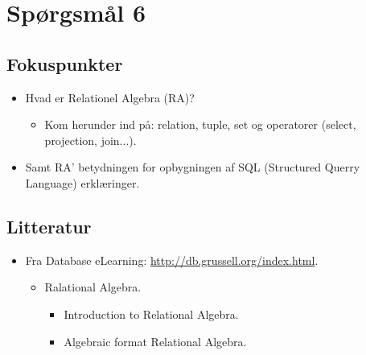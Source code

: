 \section{Spørgsmål 6}


\subsection{Fokuspunkter}
\begin{itemize}
	\item Hvad er Relationel Algebra (RA)?
	\begin{itemize}
		\item Kom herunder ind på: relation, tuple, set og operatorer (select, projection, join...).
	\end{itemize}
	\item Samt RA' betydningen for opbygningen af  SQL (Structured Querry Language) erklæringer.
\end{itemize}

\subsection{Litteratur}
\begin{itemize}
	
	
	\item Fra Database eLearning: \url{http://db.grussell.org/index.html}.
	\begin{itemize}
		\item Ralational Algebra.
		\begin{itemize}
			\item Introduction to Relational Algebra.
			\item Algebraic format Relational Algebra.
		\end{itemize}
	\end{itemize}
	
%	
\end{itemize}

